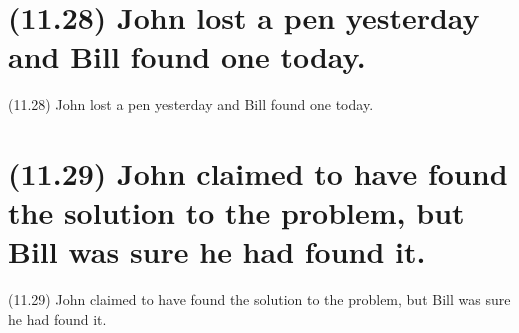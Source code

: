 \documentclass{article}
\begin{document}
%
%

\section*{(11.28) John lost a pen yesterday and Bill found one today.}

\bigbreak
\begin{enumerate*}
\item[(11.28)] John lost a pen yesterday and Bill found one today.
\end{enumerate*}
\bigbreak

\bigbreak
\begin{minipage}{\textwidth}
\end{minipage}
\bigbreak

\clearpage

%
%

\section*{(11.29) John claimed to have found the solution to the problem, but Bill was sure he had found it.}

\bigbreak
\begin{enumerate*}
\item[(11.29)] John claimed to have found the solution to the problem, but Bill was sure he had found it.
\end{enumerate*}
\bigbreak
\end{document}
